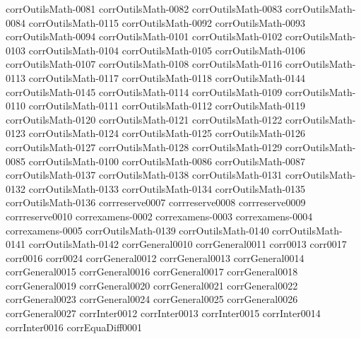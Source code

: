 {corrOutilsMath-0081}
{corrOutilsMath-0082}
{corrOutilsMath-0083}
{corrOutilsMath-0084}
{corrOutilsMath-0115}
{corrOutilsMath-0092}
{corrOutilsMath-0093}
{corrOutilsMath-0094}
{corrOutilsMath-0101}
{corrOutilsMath-0102}
{corrOutilsMath-0103}
{corrOutilsMath-0104}
{corrOutilsMath-0105}
{corrOutilsMath-0106}
{corrOutilsMath-0107}
{corrOutilsMath-0108}
{corrOutilsMath-0116}
{corrOutilsMath-0113}
{corrOutilsMath-0117}
{corrOutilsMath-0118}
{corrOutilsMath-0144}
{corrOutilsMath-0145}
{corrOutilsMath-0114}
{corrOutilsMath-0109}
{corrOutilsMath-0110}
{corrOutilsMath-0111}
{corrOutilsMath-0112}
{corrOutilsMath-0119}
{corrOutilsMath-0120}
{corrOutilsMath-0121}
{corrOutilsMath-0122}
{corrOutilsMath-0123}
{corrOutilsMath-0124}
{corrOutilsMath-0125}
{corrOutilsMath-0126}
{corrOutilsMath-0127}
{corrOutilsMath-0128}
{corrOutilsMath-0129}
{corrOutilsMath-0085}
{corrOutilsMath-0100}
{corrOutilsMath-0086}
{corrOutilsMath-0087}
{corrOutilsMath-0137}
{corrOutilsMath-0138}
{corrOutilsMath-0131}
{corrOutilsMath-0132}
{corrOutilsMath-0133}
{corrOutilsMath-0134}
{corrOutilsMath-0135}
{corrOutilsMath-0136}
{corrreserve0007}
{corrreserve0008}
{corrreserve0009}
{corrreserve0010}
{correxamens-0002}
{correxamens-0003}
{correxamens-0004}
{correxamens-0005}
{corrOutilsMath-0139}
{corrOutilsMath-0140}
{corrOutilsMath-0141}
{corrOutilsMath-0142}
{corrGeneral0010}
{corrGeneral0011}
{corr0013}
{corr0017}
{corr0016}
{corr0024}
{corrGeneral0012}
{corrGeneral0013}
{corrGeneral0014}
{corrGeneral0015}
{corrGeneral0016}
{corrGeneral0017}
{corrGeneral0018}
{corrGeneral0019}
{corrGeneral0020}
{corrGeneral0021}
{corrGeneral0022}
{corrGeneral0023}
{corrGeneral0024}
{corrGeneral0025}
{corrGeneral0026}
{corrGeneral0027}
{corrInter0012}
{corrInter0013}
{corrInter0015}
{corrInter0014}
{corrInter0016}
{corrEquaDiff0001}
